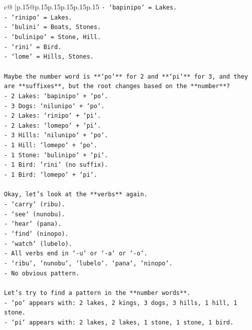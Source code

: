 \documentclass{article}
\begin{document}
{\begin{supertabular}{c@{$\;$}|p{.15\linewidth}@{}p{.15\linewidth}p{.15\linewidth}p{.15\linewidth}p{.15\linewidth}p{.15\linewidth}}
{{{\texttt{{-} `bapinipo` = Lakes.} \\
\texttt{{-} `rinipo` = Lakes.} \\
\texttt{{-} `bulini` = Boats, Stones.} \\
\texttt{{-} `bulinipo` = Stone, Hill.} \\
\texttt{{-} `rini` = Bird.} \\
\texttt{{-} `lome` = Hills, Stones.} \\
\\ 
\texttt{Maybe the number word is **`po`** for 2 and **`pi`** for 3, and they are **suffixes**, but the root changes based on the **number**?} \\
\texttt{{-} 2 Lakes: `bapinipo` + `po`.} \\
\texttt{{-} 3 Dogs: `nilunipo` + `po`.} \\
\texttt{{-} 2 Lakes: `rinipo` + `pi`.} \\
\texttt{{-} 2 Lakes: `lomepo` + `pi`.} \\
\texttt{{-} 3 Hills: `nilunipo` + `po`.} \\
\texttt{{-} 1 Hill: `lomepo` + `po`.} \\
\texttt{{-} 1 Stone: `bulinipo` + `pi`.} \\
\texttt{{-} 1 Bird: `rini` (no suffix).} \\
\texttt{{-} 1 Bird: `lomepo` + `pi`.} \\
\\ 
\texttt{Okay, let's look at the **verbs** again.} \\
\texttt{{-} `carry` (ribu).} \\
\texttt{{-} `see` (nunobu).} \\
\texttt{{-} `hear` (pana).} \\
\texttt{{-} `find` (ninopo).} \\
\texttt{{-} `watch` (lubelo).} \\
\texttt{{-} All verbs end in `{-}u` or `{-}a` or `{-}o`.} \\
\texttt{{-} `ribu`, `nunobu`, `lubelo`. `pana`, `ninopo`.} \\
\texttt{{-} No obvious pattern.} \\
\\ 
\texttt{Let's try to find a pattern in the **number words**.} \\
\texttt{{-} `po` appears with: 2 lakes, 2 kings, 3 dogs, 3 hills, 1 hill, 1 stone.} \\
\texttt{{-} `pi` appears with: 2 lakes, 2 lakes, 1 stone, 1 stone, 1 bird.} \\
}}}
\end{supertabular}}
\end{document}

